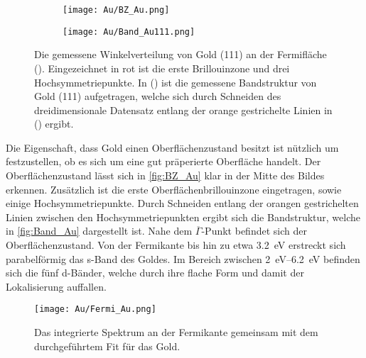         \begin{figure}
            \centering
            \begin{subfigure}[t]{0.34\textwidth}
                \centering
                \texttt{[image: Au/BZ\_Au.png]}
                \subcaption{}
                \label{fig:BZ_Au}
            \end{subfigure}
            \begin{subfigure}[t]{0.62\textwidth}
                \centering
                \texttt{[image: Au/Band\_Au111.png]}
                \subcaption{}
                \label{fig:Band_Au}
            \end{subfigure}
            \caption{Die gemessene Winkelverteilung von Gold (111) an der Fermifläche ().
            Eingezeichnet in rot ist die erste Brillouinzone und drei Hochsymmetriepunkte.
            In () ist die gemessene Bandstruktur von Gold (111) aufgetragen, welche sich durch Schneiden des dreidimensionale Datensatz entlang der orange gestrichelte Linien in () ergibt.}
        \end{figure}
        Die Eigenschaft, dass Gold einen Oberflächenzustand besitzt ist nützlich um festzustellen, ob es sich um eine gut präperierte Oberfläche handelt.
        Der Oberflächenzustand lässt sich in \autoref{fig:BZ_Au} klar in der Mitte des Bildes erkennen.
        Zusätzlich ist die erste Oberflächenbrillouinzone eingetragen, sowie einige Hochsymmetriepunkte.
        Durch Schneiden entlang der orangen gestrichelten Linien zwischen den Hochsymmetriepunkten ergibt sich die Bandstruktur, welche in \autoref{fig:Band_Au} dargestellt ist.
        Nahe dem $\overline{\Gamma}$-Punkt befindet sich der Oberflächenzustand.
        Von der Fermikante bis hin zu etwa \SI{3.2}{\electronvolt} erstreckt sich parabelförmig das s-Band des Goldes.
        Im Bereich zwischen \SIrange{2}{6.2}{\electronvolt} befinden sich die fünf d-Bänder, welche durch ihre flache Form und damit der Lokalisierung auffallen.

        \begin{figure}
            \centering
            \texttt{[image: Au/Fermi\_Au.png]}
            \caption{Das integrierte Spektrum an der Fermikante gemeinsam mit dem durchgeführtem Fit für das Gold.}
            \label{fig:Fermi_Au}
        \end{figure}

